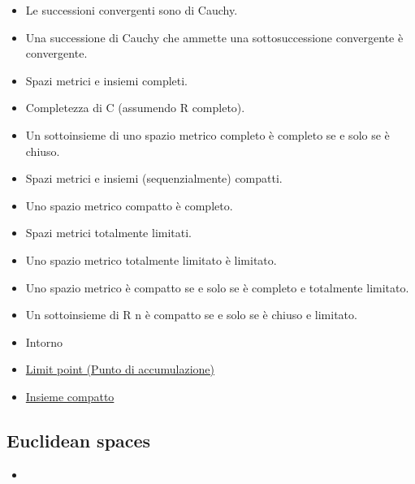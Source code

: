 \documentclass[a4paper,10pt]{article}
\begin{document}
\begin{itemize}
    \item Le successioni convergenti sono di Cauchy. 
    \item Una successione di Cauchy che ammette una sottosuccessione convergente è convergente. 
    \item Spazi metrici e insiemi completi.
    \item Completezza di C (assumendo R completo). 
    \item Un sottoinsieme di uno spazio metrico completo è completo se e solo se è chiuso. 
    \item Spazi metrici e insiemi (sequenzialmente) compatti. 
    \item Uno spazio metrico compatto è completo. 
    \item Spazi metrici totalmente limitati. 
    \item Uno spazio metrico totalmente limitato è limitato. 
    \item Uno spazio metrico è compatto se e solo se è completo e totalmente limitato. 
    \item Un sottoinsieme di R n è compatto se e solo se è chiuso e limitato. 
    \item Intorno
    \item \href{LimitPoint.pdf}{Limit point (Punto di accumulazione)}
    \item \href{InsiemeCompatto.pdf}{Insieme compatto}
  \end{itemize}  

  \subsection*{Euclidean spaces}
    \begin{itemize}
     \item 
    \end{itemize}

  
\end{document}
